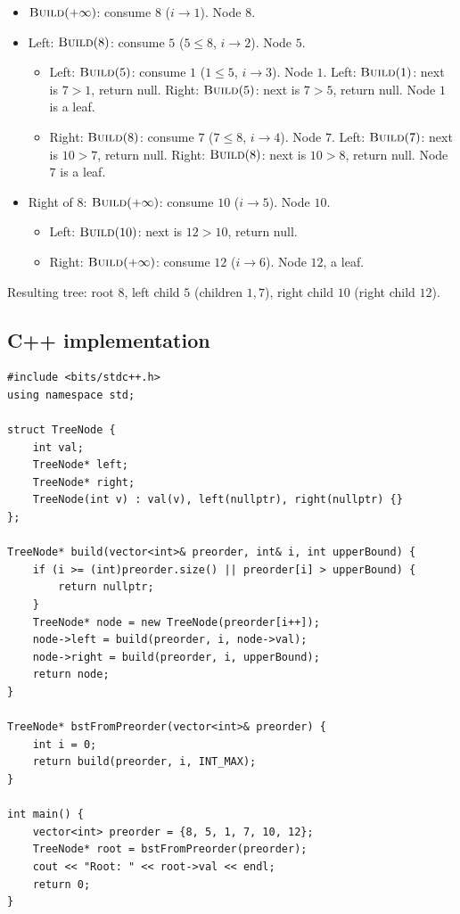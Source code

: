 \begin{itemize}
  \item $\textsc{Build}(+\infty)$: consume $8$ ($i \to 1$). Node $8$.
  \item Left: $\textsc{Build}(8)$: consume $5$ ($5\le8$, $i\to2$). Node
        $5$.
  \begin{itemize}
    \item Left: $\textsc{Build}(5)$: consume $1$ ($1\le5$, $i\to3$).
          Node $1$. Left: $\textsc{Build}(1)$: next is $7>1$, return
          null. Right: $\textsc{Build}(5)$: next is $7>5$, return null.
          Node $1$ is a leaf.
    \item Right: $\textsc{Build}(8)$: consume $7$ ($7\le8$, $i\to4$).
          Node $7$. Left: $\textsc{Build}(7)$: next is $10>7$, return
          null. Right: $\textsc{Build}(8)$: next is $10>8$, return null.
          Node $7$ is a leaf.
  \end{itemize}
  \item Right of $8$: $\textsc{Build}(+\infty)$: consume $10$
        ($i\to5$). Node $10$.
  \begin{itemize}
    \item Left: $\textsc{Build}(10)$: next is $12>10$, return null.
    \item Right: $\textsc{Build}(+\infty)$: consume $12$ ($i\to6$).
          Node $12$, a leaf.
  \end{itemize}
\end{itemize}

Resulting tree: root $8$, left child $5$ (children $1,7$), right child
$10$ (right child $12$).

\subsection*{C++ implementation}

\begin{lstlisting}
#include <bits/stdc++.h>
using namespace std;

struct TreeNode {
    int val;
    TreeNode* left;
    TreeNode* right;
    TreeNode(int v) : val(v), left(nullptr), right(nullptr) {}
};

TreeNode* build(vector<int>& preorder, int& i, int upperBound) {
    if (i >= (int)preorder.size() || preorder[i] > upperBound) {
        return nullptr;
    }
    TreeNode* node = new TreeNode(preorder[i++]);
    node->left = build(preorder, i, node->val);
    node->right = build(preorder, i, upperBound);
    return node;
}

TreeNode* bstFromPreorder(vector<int>& preorder) {
    int i = 0;
    return build(preorder, i, INT_MAX);
}

int main() {
    vector<int> preorder = {8, 5, 1, 7, 10, 12};
    TreeNode* root = bstFromPreorder(preorder);
    cout << "Root: " << root->val << endl;
    return 0;
}
\end{lstlisting}

